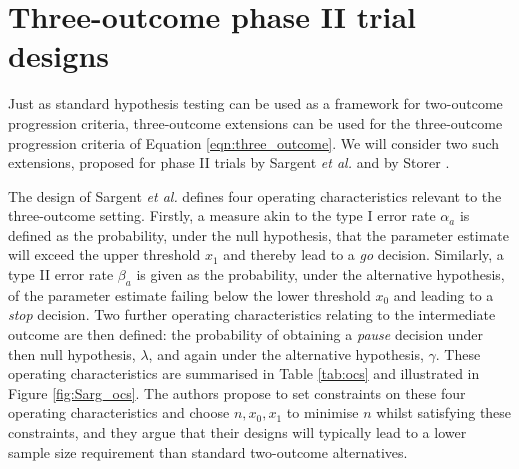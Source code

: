\documentclass[sagev]{sagej}
\begin{document}
\section{Three-outcome phase II trial designs}\label{sec:review}

Just as standard hypothesis testing can be used as a framework for two-outcome progression criteria, three-outcome extensions can be used for the three-outcome progression criteria of Equation \ref{eqn:three_outcome}. We will consider two such extensions, proposed for phase II trials by Sargent \emph{et al.} \cite{Sargent2001} and by Storer \cite{Storer1992}.

The design of Sargent \emph{et al.} defines four operating characteristics relevant to the three-outcome setting. Firstly, a measure akin to the type I error rate $\alpha_a$ is defined as the probability, under the null hypothesis, that the parameter estimate will exceed the upper threshold $x_1$ and thereby lead to a \emph{go} decision. Similarly, a type II error rate $\beta_a$ is given as the probability, under the alternative hypothesis, of the parameter estimate failing below the lower threshold $x_0$ and leading to a \emph{stop} decision. Two further operating characteristics relating to the intermediate outcome are then defined: the probability of obtaining a \emph{pause} decision under then null hypothesis, $\lambda$, and again under the alternative hypothesis, $\gamma$. These operating characteristics are summarised in Table \ref{tab:ocs} and illustrated in Figure \ref{fig:Sarg_ocs}. The authors propose to set constraints on these four operating characteristics and choose $n, x_0, x_1$ to minimise $n$ whilst satisfying these constraints, and they argue that their designs will typically lead to a lower sample size requirement than standard two-outcome alternatives.
\end{document}
